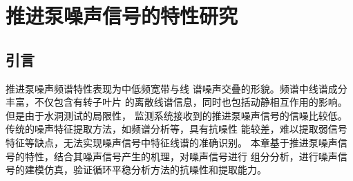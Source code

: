 \chapter{推进泵噪声信号的特性研究}
\section{引言}
推进泵噪声频谱特性表现为中低频宽带与线
谱噪声交叠的形貌。频谱中线谱成分丰富，不仅包含有转子叶片
的离散线谱信息，同时也包括动静相互作用的影响。
但是由于水洞测试的局限性，
监测系统接收到的推进泵噪声信号的信噪比较低。
传统的噪声特征提取方法，如频谱分析等，具有抗噪性
能较差，难以提取弱信号特征等缺点，无法实现噪声信号中特征线谱的准确识别。
本章基于推进泵噪声信号的特性，结合其噪声信号产生的机理，对噪声信号进行
组分分析，进行噪声信号的建模仿真，验证循环平稳分析方法的抗噪性和提取能力。
\begin{comment}
推进泵噪声按声源类型的不同，可以将推进泵噪声分为流致噪声和振动噪声，其中流致噪声是推进泵噪声的主要贡献者。
流致噪声是由泵内非定常流动与泵相互作用产生的非定常流致激励所引起的，
前期研究发现，推进泵叶轮与其他部件之间的动静干涉是重要的流致噪声激励源。
动静干涉是指由于推进泵转子（如叶轮）和静止部件（如导叶和导管）之间的周
向不均匀流动在旋转过程中相互作用，从而导致了泵内部流道中复杂的非定常流动现象。
因此，推进泵噪声是推进泵流致激励特性的最直接的外在表现，
构建推进泵流致激励源特征提取的有效方法和途径，从噪声信号中分析出流致激励源
的影响程度以及两者的作用机理，对于推进泵低噪声设计及发展噪声能量主动控制技术至关重要。

第三章推进泵噪声试验结果显示，监测到的推进泵噪声频谱特性表现为中低频线谱噪声，中低频宽带谱噪声和
高频宽带谱噪声。
噪声信号中蕴含着丰富的流致激励源信息，但是难以从噪声信号频谱中提取出流致激励源特征信号，信号中存在复杂的干扰因素：
其一，推进泵处在复杂的背景环境声场中，背景声场中存在复杂的干扰
成分，影响测试系统对推进泵目标真实辐射噪声信号的监测；其二，推进泵结构复杂，
由于具有周期性分布的旋转、静止构件和导管，
辐射噪声的声源构件并不单一，其辐射噪声具有分量复杂性。
基于上述干扰因素，监测系统接收到的目标声场信号的
信噪比较低，特征信号如动静干涉频率、轴频等与其他背景噪声相比均较为微弱，给基于传统噪声特征提取方法带来了困难，
难以准确的获得推进泵的工作状态和结构信息，也给流致激励源特征的提取带来很大的难度。

其次，推进泵流致噪声存在显著的调制现象，上章节所研究的推进泵噪声频谱已呈现出较强的调制特性，
调制现象也是流致激励作用的结果，其中蕴含着丰富的流致激励源信息，
但是传统的频谱分析及解调方法无法实现高精度低频调制特征的提取。
因此，针对推进泵噪声信号的特点，开展对其噪声信号的分量分析研究，
基于其信号的循环平稳特性，
建立流致激励源-噪声信号模型，
探索合适的流致激励源特征提取方法，对噪声的机理分析和流致激励源特征提取有重要意义。
\end{comment}

